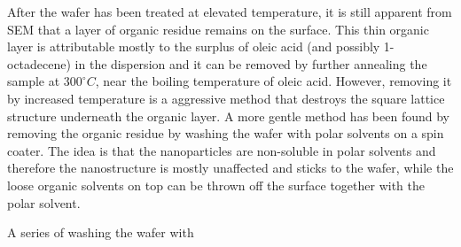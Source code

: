 \documentclass[\main/dresen_thesis.tex]{subfiles}
\begin{document}
  After the wafer has been treated at elevated temperature, it is still apparent from SEM that a layer of organic residue remains on the surface.
  This thin organic layer is attributable mostly to the surplus of oleic acid (and possibly 1-octadecene) in the dispersion and it can be removed by further annealing the sample at $300 ^\circ C$, near the boiling temperature of oleic acid.
  However, removing it by increased temperature is a aggressive method that destroys the square lattice structure underneath the organic layer.
  A more gentle method has been found by removing the organic residue by washing the wafer with polar solvents on a spin coater.
  The idea is that the nanoparticles are non-soluble in polar solvents and therefore the nanostructure is mostly unaffected and sticks to the wafer, while the loose organic solvents on top can be thrown off the surface together with the polar solvent.

  A series of washing the wafer with 
\end{document}
